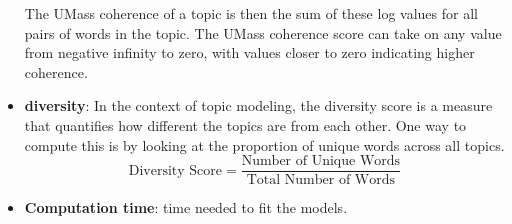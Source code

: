 \begin{itemize}
    The UMass coherence of a topic is then the sum of these log values for all pairs of words in the topic. The UMass coherence score can take on any value from negative infinity to zero, with values closer to zero indicating higher coherence.
    

    \item \textbf{diversity}: In the context of topic modeling, the diversity score is a measure that quantifies how different the topics are from each other. One way to compute this is by looking at the proportion of unique words across all topics.
    \begin{equation}
            \text{Diversity Score} = \frac{{\text{Number of Unique Words}}}{{\text{Total Number of Words}}}
    \end{equation}


    \item \textbf{Computation time}: time needed to fit the models.
\end{itemize}
